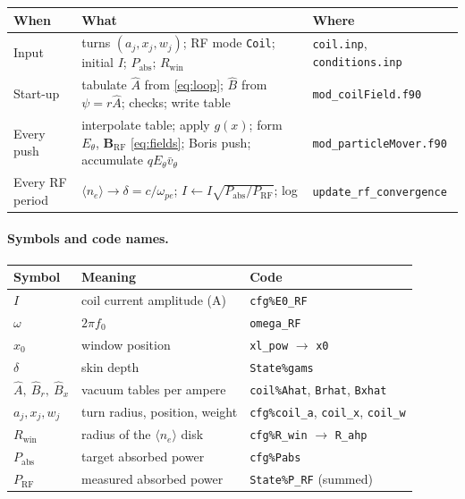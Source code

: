 \documentclass[11pt,a4paper]{article}
\newcommand{\Ahat}{\hat{A}}
\newcommand{\Bhat}{\hat{B}}
\newcommand{\code}[1]{\texttt{#1}}
\begin{document}
\begin{center}
\renewcommand{\arraystretch}{1.3}
\begin{tabular}{@{}p{}p{}p{}@{}}
\toprule
When & What & Where \\
\midrule
Input & turns $(a_j,x_j,w_j)$; RF mode \code{Coil}; initial $I$;
        $P_{\mathrm{abs}}$; $R_{\mathrm{win}}$
      & \code{coil.inp}, \code{conditions.inp} \\
Start-up & tabulate $\Ahat$ from \eqref{eq:loop}; $\Bhat$ from $\psi=r\Ahat$;
           checks; write table
         & \code{mod\_coilField.f90} \\
Every push & interpolate table; apply $g(x)$; form $E_\theta$,
             $\mathbf B_{\mathrm{RF}}$ \eqref{eq:fields}; Boris push;
             accumulate $qE_\theta\bar v_\theta$
           & \code{mod\_particleMover.f90} \\
Every RF period & $\langle n_e\rangle\to\delta=c/\omega_{pe}$;
                  $I\leftarrow I\sqrt{P_{\mathrm{abs}}/P_{\mathrm{RF}}}$; log
                & \code{update\_rf\_convergence} \\
\bottomrule
\end{tabular}
\end{center}

\paragraph{Symbols and code names.}
\begin{center}
\begin{tabular}{@{}lll@{}}
\toprule
Symbol & Meaning & Code \\
\midrule
$I$ & coil current amplitude (A) & \code{cfg\%E0\_RF} \\
$\omega$ & $2\pi f_0$ & \code{omega\_RF} \\
$x_0$ & window position & \code{xl\_pow} $\to$ \code{x0} \\
$\delta$ & skin depth & \code{State\%gams} \\
$\Ahat,\ \Bhat_r,\ \Bhat_x$ & vacuum tables per ampere & \code{coil\%Ahat}, \code{Brhat}, \code{Bxhat} \\
$a_j, x_j, w_j$ & turn radius, position, weight & \code{cfg\%coil\_a}, \code{coil\_x}, \code{coil\_w} \\
$R_{\mathrm{win}}$ & radius of the $\langle n_e\rangle$ disk & \code{cfg\%R\_win} $\to$ \code{R\_ahp} \\
$P_{\mathrm{abs}}$ & target absorbed power & \code{cfg\%Pabs} \\
$P_{\mathrm{RF}}$ & measured absorbed power & \code{State\%P\_RF} (summed) \\
\bottomrule
\end{tabular}
\end{center}
\end{document}
